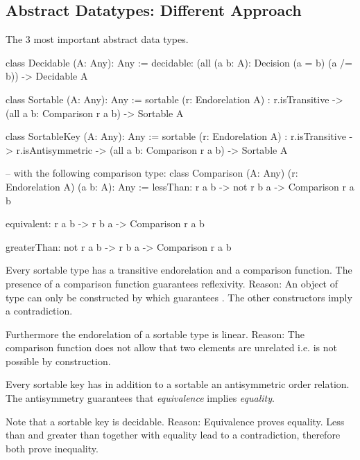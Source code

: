 \subsection{Abstract Datatypes: Different Approach}



The 3 most important abstract data types.

\begin{alba}
    class Decidable (A: Any): Any :=
        decidable: (all (a b: A): Decision (a = b) (a /= b)) -> Decidable A

    class Sortable (A: Any): Any :=
        sortable
            (r: Endorelation A)
            :
                r.isTransitive
                ->
                (all a b: Comparison r a b)
                ->
                Sortable A

    class SortableKey (A: Any): Any :=
        sortable
            (r: Endorelation A)
            :
                r.isTransitive
                ->
                r.isAntisymmetric
                ->
                (all a b: Comparison r a b)
                ->
                Sortable A

    -- with the following comparison type:
    class Comparison (A: Any) (r: Endorelation A) (a b: A): Any :=
        lessThan: r a b -> not r b a -> Comparison r a b

        equivalent: r a b -> r b a -> Comparison r a b

        greaterThan: not r a b -> r b a -> Comparison r a b
\end{alba}
%
Every sortable type has a transitive endorelation and a comparison function. The
presence of a comparison function guarantees reflexivity. Reason:
An object of type  can only be constructed by
 which guarantees . The other constructors imply a
contradiction.

Furthermore the endorelation of a sortable type is linear. Reason: The
comparison function does not allow that two elements are unrelated i.e.
 is not possible by construction.

Every sortable key has in addition to a sortable an antisymmetric order
relation. The antisymmetry guarantees that {\em equivalence} implies {\em
equality}.

Note that a sortable key is decidable. Reason: Equivalence proves equality. Less
than and greater than together with equality lead to a contradiction, therefore
both prove inequality.





